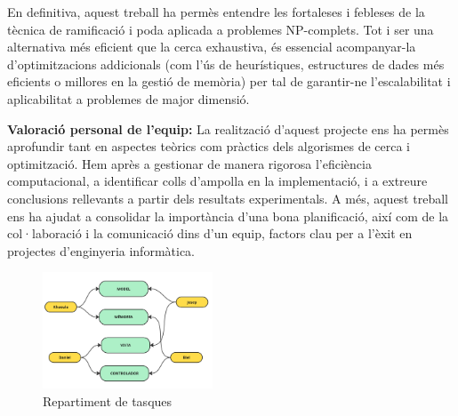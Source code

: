 \documentclass{ieeetj}
\begin{document}
En definitiva, aquest treball ha permès entendre les fortaleses i febleses de la tècnica de ramificació i poda aplicada a problemes NP-complets. Tot i ser una alternativa més eficient que la cerca exhaustiva, és essencial acompanyar-la d’optimitzacions addicionals (com l’ús de heurístiques, estructures de dades més eficients o millores en la gestió de memòria) per tal de garantir-ne l’escalabilitat i aplicabilitat a problemes de major dimensió.

\medskip

\noindent
\textbf{Valoració personal de l'equip:} La realització d’aquest projecte ens ha permès aprofundir tant en aspectes teòrics com pràctics dels algorismes de cerca i optimització. Hem après a gestionar de manera rigorosa l’eficiència computacional, a identificar colls d’ampolla en la implementació, i a extreure conclusions rellevants a partir dels resultats experimentals. A més, aquest treball ens ha ajudat a consolidar la importància d’una bona planificació, així com de la col·laboració i la comunicació dins d’un equip, factors clau per a l’èxit en projectes d’enginyeria informàtica.



\begin{figure}[H]
    \centering
    \includegraphics[width=0.45\textwidth]{png/repartiment.jpg}
    \caption{Repartiment de tasques}
    \label{fig:enter-label}
\end{figure}
\end{document}
